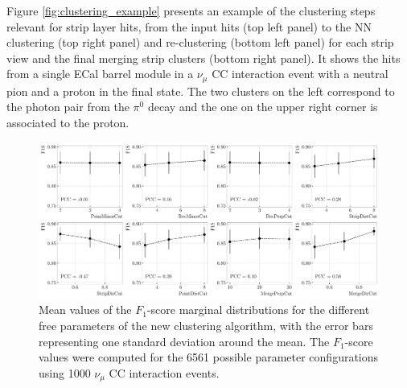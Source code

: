 Figure \ref{fig:clustering_example} presents an example of the clustering steps relevant for strip layer hits, from the input hits (top left panel) to the NN clustering (top right panel) and re-clustering (bottom left panel) for each strip view and the final merging strip clusters (bottom right panel). It shows the hits from a single ECal barrel module in a $\nu_{\mu}$ CC interaction event with a neutral pion and a proton in the final state. The two clusters on the left correspond to the photon pair from the $\pi^{0}$ decay and the one on the upper right corner is associated to the proton.

\begin{figure}[t]
	\centering
	\includegraphics[width=.99\linewidth]{Images/GArSoft_PID/Neutral/coolcluster_optimisation_F1S.pdf}
	\caption{Mean values of the $F_{1}$-score marginal distributions for the different free parameters of the new clustering algorithm, with the error bars representing one standard deviation around the mean. The $F_{1}$-score values were computed for the 6561 possible parameter configurations using 1000 $\nu_{\mu}$ CC interaction events.}
	\label{fig:clustering_optimisation}
\end{figure}


